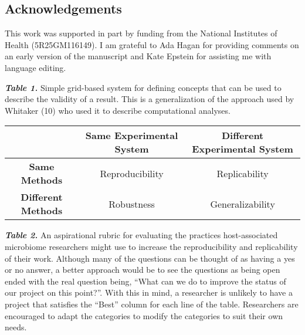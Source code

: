 \documentclass[]{article}
\begin{document}
\subsection{Acknowledgements}\label{acknowledgements}

This work was supported in part by funding from the National Institutes
of Health (5R25GM116149). I am grateful to Ada Hagan for providing
comments on an early version of the manuscript and Kate Epstein for
assisting me with language editing.

\newpage

\textbf{\emph{Table 1.}} Simple grid-based system for defining concepts
that can be used to describe the validity of a result. This is a
generalization of the approach used by Whitaker (10) who used it to
describe computational analyses.

\vspace{1cm}

\begin{center}
    \begin{tabular}{ | c | c | c |}
    \hline
        & \textbf{Same Experimental System} & \textbf{Different Experimental System} \\ \hline
        \textbf{Same Methods} & Reproducibility & Replicability \\ \hline
        \textbf{Different Methods} & Robustness & Generalizability \\
    \hline
    \end{tabular}
\end{center}

\newpage

\textbf{\emph{Table 2.}} An aspirational rubric for evaluating the
practices host-associated microbiome researchers might use to increase
the reproducibility and replicability of their work. Although many of
the questions can be thought of as having a yes or no answer, a better
approach would be to see the questions as being open ended with the real
question being, ``What can we do to improve the status of our project on
this point?''. With this in mind, a researcher is unlikely to have a
project that satisfies the ``Best'' column for each line of the table.
Researchers are encouraged to adapt the categories to modify the
categories to suit their own needs.
\end{document}
